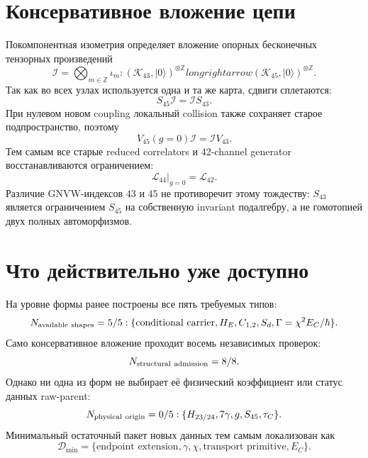 \section{Консервативное вложение цепи}

Покомпонентная изометрия определяет вложение опорных бесконечных тензорных
произведений
\begin{equation}
 \mathcal I=\bigotimes_{m\in\mathbb Z}\iota_m:
 (\mathcal K_{43},|0\rangle)^{\otimes\mathbb Z}longrightarrow
 (\mathcal K_{45},|0\rangle)^{\otimes\mathbb Z}.
 \label{eq:v8-mediator-admission-chain-isometry}
\end{equation}
Так как во всех узлах используется одна и та же карта, сдвиги сплетаются:
\begin{equation}
 S_{45}\mathcal I=\mathcal I S_{43}.
 \label{eq:v8-mediator-admission-shift-intertwining}
\end{equation}
При нулевом новом coupling локальный collision также сохраняет старое
подпространство, поэтому
\begin{equation}
 V_{45}(g=0)\mathcal I=\mathcal I V_{43}.
 \label{eq:v8-mediator-admission-floquet-intertwining}
\end{equation}
Тем самым все старые reduced correlators и 42-channel generator
восстанавливаются ограничением:
\begin{equation}
 \left.\mathcal L_{44}\right|_{g=0}=\mathcal L_{42}.
 \label{eq:v8-mediator-admission-generator-restriction}
\end{equation}
Различие GNVW-индексов $43$ и $45$ не противоречит этому тождеству:
$S_{43}$ является ограничением $S_{45}$ на собственную invariant
подалгебру, а не гомотопией двух полных автоморфизмов.

\section{Что действительно уже доступно}

На уровне формы ранее построены все пять требуемых типов:
\begin{equation}
 N_{\rm available\ shapes}=5/5:
 \{\text{conditional carrier},H_E,C_{1,2},S_d,
 \Gamma=\chi^2E_C/\hbar\}.
 \label{eq:v8-mediator-admission-shape-ledger}
\end{equation}
Само консервативное вложение проходит восемь независимых проверок:
\begin{equation}
 N_{\rm structural\ admission}=8/8.
 \label{eq:v8-mediator-admission-structural-ledger}
\end{equation}
Однако ни одна из форм не выбирает её физический коэффициент или статус
данных raw-parent:
\begin{equation}
 N_{\rm physical\ origin}=0/5:
 \{H_{23/24},7\gamma,g,S_{45},\tau_C\}.
 \label{eq:v8-mediator-admission-origin-ledger}
\end{equation}
Минимальный остаточный пакет новых данных тем самым локализован как
\begin{equation}
 \mathcal D_{\min}=\{\text{endpoint extension},\gamma,\chi,
 \text{transport primitive},E_C\}.
 \label{eq:v8-mediator-admission-minimal-data}
\end{equation}

